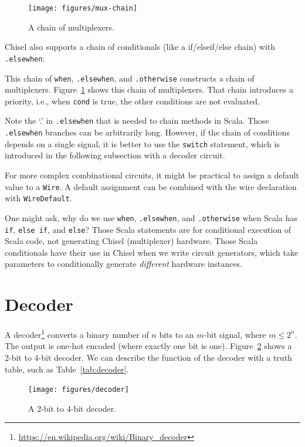\documentclass[%
    10pt,
    headinclude, footexclude,
    openright, %
    notitlepage,
    cleardoubleempty,
    headsepline,
    pointlessnumbers,
    bibtotoc, idxtotoc,
    ]{scrbook}
\newcommand{\code}[1]{{\small{\texttt{#1}}}}
\newcommand{\myref}[2]{\href{#1}{#2}}
\renewcommand{\myref}[2]{{#2}{\footnote{\url{#1}}}}
\begin{document}
\begin{figure}
  \centering
  \texttt{[image: figures/mux-chain]}
  \caption{A chain of multiplexers.}
  \label{fig:mux-chain}
\end{figure}

Chisel also supports a chain of conditionals (like a if/elseif/else chain) with \code{.elsewhen}:


\noindent This chain of \code{when}, \code{.elsewhen}, and \code{.otherwise}
constructs a chain of multiplexers. Figure~\ref{fig:mux-chain} shows this chain of multiplexers.
That chain introduces a priority, i.e., when \code{cond} is true, the other conditions
are not evaluated.

Note the `.' in \code{.elsewhen} that is needed to chain methods in Scala.
Those \code{.elsewhen} branches can be arbitrarily long.
However, if the chain of conditions depends on a single signal, it is better
to use the \code{switch} statement, which is introduced in the following
subsection with a decoder circuit.

For more complex combinational circuits, it might be practical to assign
a default value to a \code{Wire}. A default assignment can be combined with the wire
declaration with \code{WireDefault}.


One might ask, why do we use \code{when}, \code{.elsewhen}, and \code{.otherwise}
when Scala has \code{if}, \code{else if}, and \code{else}? Those Scala statements are for
conditional execution of Scala code, not generating Chisel (multiplexer) hardware.
Those Scala conditionals have their use in Chisel when we write circuit generators,
which take parameters to conditionally generate \emph{different} hardware instances.

\section{Decoder}

A \myref{https://en.wikipedia.org/wiki/Binary_decoder}{decoder}
converts a binary number of $n$ bits to an $m$-bit signal, where $m \leq 2^n$.
The output is one-hot encoded (where exactly one bit is one).
Figure~\ref{fig:decoder} shows a 2-bit to 4-bit decoder. We can describe the function
of the decoder with a truth table, such as Table~\ref{tab:decoder}.

\begin{figure}
  \centering
  \texttt{[image: figures/decoder]}
  \caption{A 2-bit to 4-bit decoder.}
  \label{fig:decoder}
\end{figure}
\end{document}
